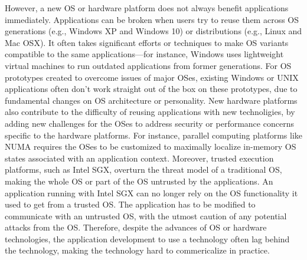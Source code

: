 However, a new OS or hardware platform does not always benefit applications immediately.
Applications can be broken when users try to reuse them across OS generations (e.g., Windows XP and Windows 10) or distributions (e.g., Linux and Mac OSX).
It often takes significant efforts or techniques to make OS variants compatible to the same applications---for instance, Windows uses lightweight virtual machines to run outdated applications from former generations.
For OS prototypes created to overcome issues of major OSes,
existing Windows or UNIX applications often don't work straight out of the box on these prototypes, due to fundamental changes on OS architecture or personality.
New hardware platforms also contribute to the difficulty of reusing applications with new technoligies,
by adding new challenges for the OSes to address security or performance concerns specific to the hardware platforms.
For instance, parallel computing platforms like NUMA requires the OSes to be customized to
maximally localize in-memory OS states associated with an application context.
Moreover, trusted execution platforms, such as Intel SGX, overturn the threat model of a traditional OS,
making the whole OS or part of the OS untrusted by the applications.
An application running with Intel SGX can no longer rely on the OS functionality
it used to get from a trusted OS.
The application has to be modified to communicate with an untrusted OS, with the utmost caution of any potential attacks from the OS.
Therefore, despite the advances of OS or hardware technologies,
the application development to use a technology often lag behind the technology,
making the technology hard to commericalize in practice.



\begin{comment}
Emulation and its challenges:
-- Emulating all abstractions of an existing operating system is a solution for facilitating the application reuse on another operating system.
-- Building a working emulation for modern applications is often cumbersome: Although the size of OS abstractions will be an obvious obstacle, some abstractions can be fundamentally challenging to emulate.
-- For example, a challenging abstraction to emulate is the multiplexing of CPU resource for concurrently running applications on the same host.
  --> Discuss multi-process abstractions.
  
Emulation by library OSes:
-- Most working, commercialized emulation solutions are based on implementing a well-known interface of the system stack, such as POSIX functions, UNIX system calls, or the hardware interface.
-- Virtualization, for instance, emulates the hardware interface required by a native, guest operating system, to reuse the applications.
-- Instead of emulating a wide, well-known interface, a narrower ``pinch point'' in the operating system can be more easily emulated, if all OS components above are packed into a ``library OS''.
  --> Discuss Drawbridge.
\end{comment}


